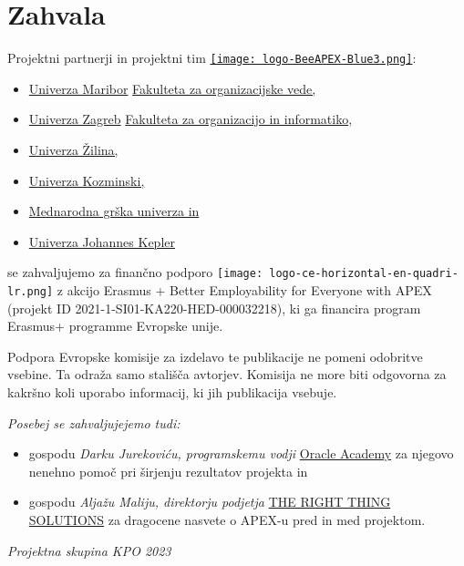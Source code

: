 \chapter*{Zahvala}

Projektni partnerji in projektni tim \href{https://beeapex.eu}{\texttt{[image: logo-BeeAPEX-Blue3.png]}}:
\begin{itemize}
	\item \href{https://www.um.si/en/home-page}{Univerza Maribor} \href{https://fov.um.si/en}{Fakulteta za organizacijske vede,} 
	\item \href{http://www.unizg.hr/homepage}{Univerza Zagreb} \href{https://www.foi.unizg.hr/en}{Fakulteta za organizacijo in informatiko,}
	\item \href{https://www.uniza.sk/index.php/en/}{Univerza Žilina,} 
	\item \href{https://www.kozminski.edu.pl/en}{Univerza Kozminski,}
	\item \href{https://www.ihu.gr/en/enhome}{Mednarodna grška univerza in }
	\item \href{https://www.jku.at/en}{Univerza Johannes Kepler}	
\end{itemize}	
se zahvaljujemo za finančno podporo \texttt{[image: logo-ce-horizontal-en-quadri-lr.png]} z akcijo Erasmus + Better Employability for Everyone with APEX (projekt ID 2021-1-SI01-KA220-HED-000032218), ki ga financira program Erasmus+ programme Evropske unije. 

Podpora Evropske komisije za izdelavo te publikacije ne pomeni odobritve vsebine. Ta odraža samo stališča avtorjev. Komisija ne more biti odgovorna za kakršno koli uporabo informacij, ki jih publikacija vsebuje.
\newline

\vspace{1cm}
\noindent \textit{Posebej se zahvaljujejemo tudi:}
\begin{itemize}
	\item gospodu \textit{Darku Jurekoviću, programskemu vodji} \href{https://academy.oracle.com}{Oracle Academy} za njegovo nenehno pomoč pri širjenju rezultatov projekta in 
	\item gospodu \textit{Aljažu Maliju, direktorju podjetja} \href{https://www.right-thing.solutions/ords/r/app/en/home}{THE RIGHT THING SOLUTIONS} za dragocene nasvete o APEX-u pred in med projektom.	
\end{itemize}

\vspace{1cm}
\noindent \textit{Projektna skupina KPO 2023}
